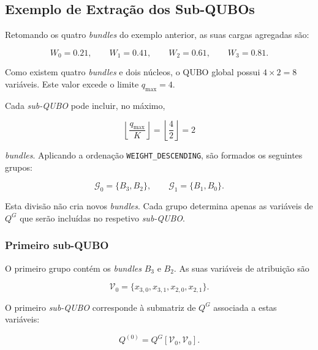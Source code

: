 \subsection{Exemplo de Extração dos Sub-QUBOs}

Retomando os quatro \textit{bundles} do exemplo anterior, as suas cargas
agregadas são:

\begin{equation}
    W_0=0.21,\qquad
    W_1=0.41,\qquad
    W_2=0.61,\qquad
    W_3=0.81.
\end{equation}

Como existem quatro \textit{bundles} e dois núcleos, o QUBO global possui
$4\times 2=8$ variáveis. Este valor excede o limite $q_{\max}=4$.

Cada \textit{sub-QUBO} pode incluir, no máximo,

\begin{equation}
    \left\lfloor\frac{q_{\max}}{K}\right\rfloor
    =
    \left\lfloor\frac{4}{2}\right\rfloor
    =2
\end{equation}

\textit{bundles}. Aplicando a ordenação \texttt{WEIGHT\_DESCENDING}, são formados
os seguintes grupos:

\begin{equation}
    \mathcal{G}_0=\{B_3,B_2\},
    \qquad
    \mathcal{G}_1=\{B_1,B_0\}.
\end{equation}

Esta divisão não cria novos \textit{bundles}. Cada grupo determina apenas
as variáveis de $Q^G$ que serão incluídas no respetivo \textit{sub-QUBO}.

\subsubsection{Primeiro sub-QUBO}

O primeiro grupo contém os \textit{bundles} $B_3$ e $B_2$. As suas
variáveis de atribuição são

\begin{equation}
    \mathcal{V}_0=
    \{x_{3,0},x_{3,1},x_{2,0},x_{2,1}\}.
\end{equation}

O primeiro \textit{sub-QUBO} corresponde à submatriz de $Q^G$ associada
a estas variáveis:

\begin{equation}
    Q^{(0)}=Q^G[\mathcal{V}_0,\mathcal{V}_0].
\end{equation}

